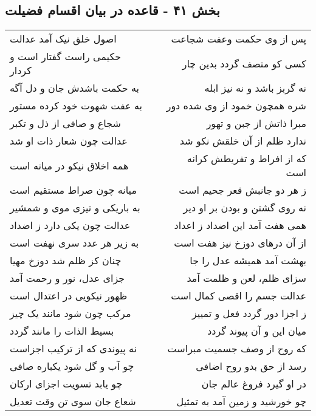 \begin{center}
\section*{بخش ۴۱ - قاعده در بیان اقسام فضیلت}
\label{sec:sh041}
\begin{longtable}{l p{0.5cm} r}
اصول خلق نیک آمد عدالت
&&
پس از وی حکمت وعفت شجاعت
\\
حکیمی راست گفتار است و کردار
&&
کسی کو متصف گردد بدین چار
\\
به حکمت باشدش جان و دل آگه
&&
نه گربز باشد و نه نیز ابله
\\
به عفت شهوت خود کرده مستور
&&
شره همچون خمود از وی شده دور
\\
شجاع و صافی از ذل و تکبر
&&
مبرا ذاتش از جبن و تهور
\\
عدالت چون شعار ذات او شد
&&
ندارد ظلم از آن خلقش نکو شد
\\
همه اخلاق نیکو در میانه است
&&
که از افراط و تفریطش کرانه است
\\
میانه چون صراط مستقیم است
&&
ز هر دو جانبش قعر جحیم است
\\
به باریکی و تیزی موی و شمشیر
&&
نه روی گشتن و بودن بر او دیر
\\
عدالت چون یکی دارد ز اضداد
&&
همی هفت آمد این اضداد ز اعداد
\\
به زیر هر عدد سری نهفت است
&&
از آن درهای دوزخ نیز هفت است
\\
چنان کز ظلم شد دوزخ مهیا
&&
بهشت آمد همیشه عدل را جا
\\
جزای عدل، نور و رحمت آمد
&&
سزای ظلم، لعن و ظلمت آمد
\\
ظهور نیکویی در اعتدال است
&&
عدالت جسم را اقصی کمال است
\\
مرکب چون شود مانند یک چیز
&&
ز اجزا دور گردد فعل و تمییز
\\
بسیط الذات را مانند گردد
&&
میان این و آن پیوند گردد
\\
نه پیوندی که از ترکیب اجزاست
&&
که روح از وصف جسمیت مبراست
\\
چو آب و گل شود یکباره صافی
&&
رسد از حق بدو روح اضافی
\\
چو یابد تسویت اجزای ارکان
&&
در او گیرد فروغ عالم جان
\\
شعاع جان سوی تن وقت تعدیل
&&
چو خورشید و زمین آمد به تمثیل
\\
\end{longtable}
\end{center}
